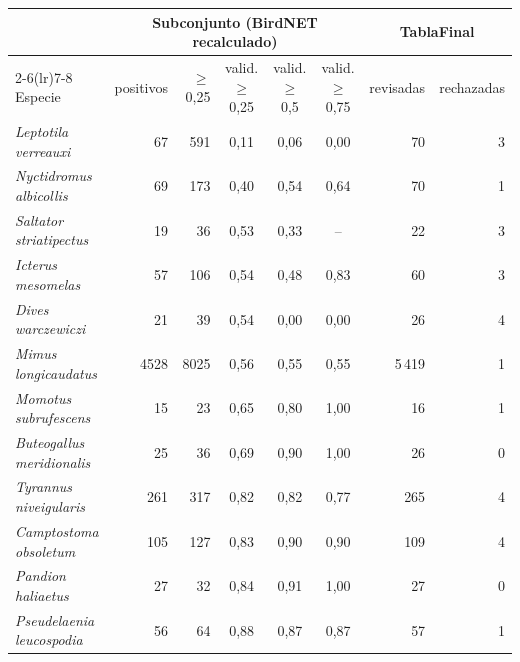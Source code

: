 \begin{tabular}{lrrcccrr}
\toprule
 & \multicolumn{5}{c}{Subconjunto (BirdNET recalculado)} & \multicolumn{2}{c}{TablaFinal}\\
\cmidrule(lr){2-6}\cmidrule(lr){7-8}
Especie & positivos & $\geq$0,25 & valid. $\geq$0,25 & valid. $\geq$0,5 & valid. $\geq$0,75 & revisadas & rechazadas\\
\midrule
\textit{Leptotila verreauxi} & 67 & 591 & 0{,}11 & 0{,}06 & 0{,}00 & 70 & 3\\
\textit{Nyctidromus albicollis} & 69 & 173 & 0{,}40 & 0{,}54 & 0{,}64 & 70 & 1\\
\textit{Saltator striatipectus} & 19 & 36 & 0{,}53 & 0{,}33 & -- & 22 & 3\\
\textit{Icterus mesomelas} & 57 & 106 & 0{,}54 & 0{,}48 & 0{,}83 & 60 & 3\\
\textit{Dives warczewiczi} & 21 & 39 & 0{,}54 & 0{,}00 & 0{,}00 & 26 & 4\\
\textit{Mimus longicaudatus} & 4528 & 8025 & 0{,}56 & 0{,}55 & 0{,}55 & 5\,419 & 1\\
\textit{Momotus subrufescens} & 15 & 23 & 0{,}65 & 0{,}80 & 1{,}00 & 16 & 1\\
\textit{Buteogallus meridionalis} & 25 & 36 & 0{,}69 & 0{,}90 & 1{,}00 & 26 & 0\\
\textit{Tyrannus niveigularis} & 261 & 317 & 0{,}82 & 0{,}82 & 0{,}77 & 265 & 4\\
\textit{Camptostoma obsoletum} & 105 & 127 & 0{,}83 & 0{,}90 & 0{,}90 & 109 & 4\\
\textit{Pandion haliaetus} & 27 & 32 & 0{,}84 & 0{,}91 & 1{,}00 & 27 & 0\\
\textit{Pseudelaenia leucospodia} & 56 & 64 & 0{,}88 & 0{,}87 & 0{,}87 & 57 & 1\\
\bottomrule
\end{tabular}

